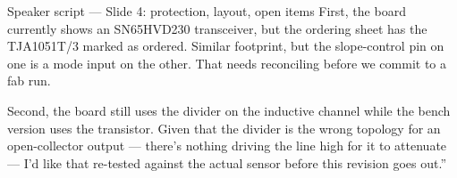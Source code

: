 \documentclass[aspectratio=169,11pt]{beamer}
\begin{document}
{\begin{frame}{Speaker script --- Slide 4: protection, layout, open items}
First, the board currently shows an SN65HVD230 transceiver, but the ordering sheet
has the TJA1051T/3 marked as ordered. Similar footprint, but the slope-control pin
on one is a mode input on the other. That needs reconciling before we commit to a
fab run.

Second, the board still uses the divider on the inductive channel while the bench
version uses the transistor. Given that the divider is the wrong topology for an
open-collector output --- there's nothing driving the line high for it to attenuate
--- I'd like that re-tested against the actual sensor before this revision goes
out.''
\end{frame}
}
\end{document}
